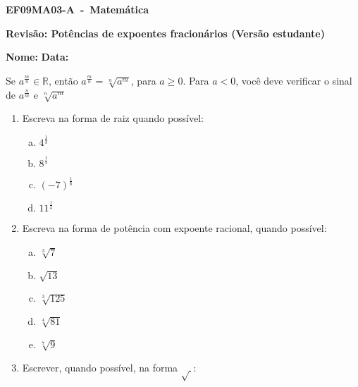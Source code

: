 \documentclass[a4paper,14pt]{article}
\begin{document}
	
	\noindent\textbf{EF09MA03-A~-~Matemática} 
	
	\begin{center}
		\textbf{Revisão: Potências de expoentes fracionários (Versão estudante)}
	\end{center}
	
	
	\noindent\textbf{Nome:} \underline{\hspace{10cm}}
    \noindent\textbf{Data:} \underline{\hspace{4cm}}
	
	
	\begin{multicols}{2}
		Se $a^\frac{m}{n} \in \mathbb{R}$, então $a^\frac{m}{n} = \sqrt[n]{a^m}$, para $a \geq 0$. Para $a < 0$, você deve verificar o sinal de $a^\frac{n}{m}$ e $\sqrt[n]{a^m}$
	\begin{enumerate}	
		\item Escreva na forma de raiz quando possível:
		\begin{enumerate}[a)]
			\item $4^\frac{1}{3}$ \\
			\item $8^\frac{1}{5}$ \\
			\item $(-7)^\frac{1}{6}$ \\
			\item $11^\frac{1}{4}$ \\
	    \end{enumerate}
        \item Escreva na forma de potência com expoente racional, quando possível:
        \begin{enumerate}[a)]
        	\item $\sqrt[3]{7}$ \\
        	\item $\sqrt{13}$ \\
        	\item $\sqrt[3]{125}$ \\
        	\item $\sqrt[4]{81}$ \\
        	\item $\sqrt[7]{9}$ \\
        \end{enumerate}
        \item Escrever, quando possível, na forma $\sqrt{~}$:

\end{enumerate}
\end{multicols}
\end{document}
